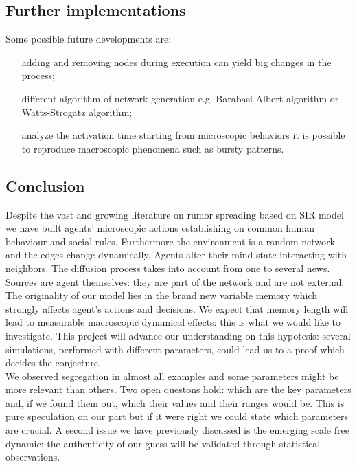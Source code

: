\subsection{Further implementations}\label{subsec:implementations}
Some possible future developments are:
%
\begin{itemize}
\item [adding and removing nodes during execution] can yield big changes
  in the process;
\item [different algorithm of network generation] e.g. Barabasi-Albert
  algorithm or Watts-Strogatz algorithm;
\item [analyze the activation time] starting from microscopic behaviors
  it is possible to reproduce macroscopic phenomena such as bursty
  patterns.\cite{goh_burstiness_2008}
\end{itemize}
%
\subsection{Conclusion}\label{subsec:conclusion}
Despite the vast and growing literature on rumor spreading based on
SIR model we have built agents' microscopic actions establishing on
common human behaviour and social rules.
Furthermore the environment is a random network and the edges
change dynamically.
Agents alter their mind state interacting with neighbors.
The diffusion process takes into account from one to several news.
Sources are agent themselves: they are part of the network
and are not external.\\
The originality of our model lies in the brand new variable memory
which strongly affects agent's actions and decisions. 
We expect that memory length will lead to measurable macroscopic
dynamical effects: this is what we would like to investigate.
This project will advance our understanding on this hypotesis:
several simulations, performed with different parameters, could lead
us to a proof which decides the conjecture.\\
We observed segregation in almost all examples and some parameters might be
more relevant than others. Two open questons hold: which are the key
parameters and, if we found them out, which their values and
their ranges would be.
This is pure speculation on our part but if it were right we could
state which parameters are crucial.
A second issue we have previously discussed is the emerging scale
free dynamic: the authenticity of our guess will be validated
through statistical observations.
 
